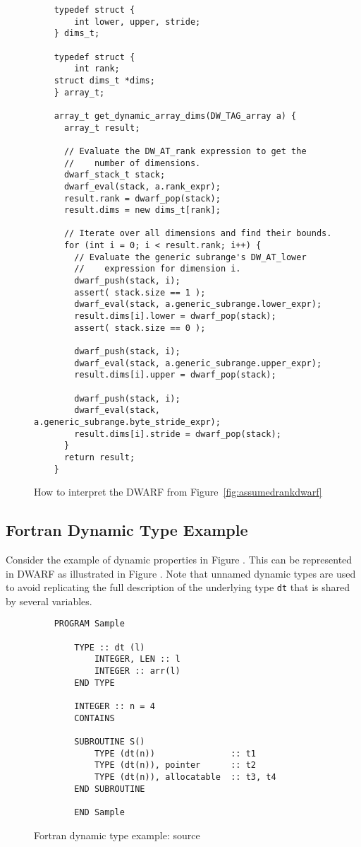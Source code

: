 \begin{figure}[!ht]
\begin{lstlisting}
    typedef struct {
        int lower, upper, stride;
    } dims_t;

    typedef struct {
        int rank;
    struct dims_t *dims;
    } array_t;

    array_t get_dynamic_array_dims(DW_TAG_array a) {
      array_t result;

      // Evaluate the DW_AT_rank expression to get the 
      //    number of dimensions.
      dwarf_stack_t stack;
      dwarf_eval(stack, a.rank_expr);
      result.rank = dwarf_pop(stack); 
      result.dims = new dims_t[rank];

      // Iterate over all dimensions and find their bounds.
      for (int i = 0; i < result.rank; i++) {
        // Evaluate the generic subrange's DW_AT_lower 
        //    expression for dimension i.
        dwarf_push(stack, i);
        assert( stack.size == 1 );
        dwarf_eval(stack, a.generic_subrange.lower_expr);
        result.dims[i].lower = dwarf_pop(stack);
        assert( stack.size == 0 );

        dwarf_push(stack, i);
        dwarf_eval(stack, a.generic_subrange.upper_expr);
        result.dims[i].upper = dwarf_pop(stack);
    
        dwarf_push(stack, i);
        dwarf_eval(stack, a.generic_subrange.byte_stride_expr);
        result.dims[i].stride = dwarf_pop(stack);
      }
      return result;
    }
\end{lstlisting}
\caption{How to interpret the DWARF from Figure~\ref{fig:assumedrankdwarf}}
\label{fig:assumedrankdwarfparser}
\end{figure}


\clearpage
\subsection{Fortran Dynamic Type Example}
\label{app:fortrandynamictypeexample}
Consider the  example of dynamic properties in 
Figure .
This can be represented in DWARF as illustrated in 
Figure .
Note that unnamed dynamic types are used to avoid replicating
the full description of the underlying type \texttt{dt} that is shared by
several variables.

\begin{figure}[ht]
\begin{lstlisting}
	PROGRAM Sample
     
        TYPE :: dt (l)
            INTEGER, LEN :: l
            INTEGER :: arr(l)
        END TYPE

        INTEGER :: n = 4
        CONTAINS

        SUBROUTINE S()
            TYPE (dt(n))               :: t1
            TYPE (dt(n)), pointer      :: t2
            TYPE (dt(n)), allocatable  :: t3, t4
        END SUBROUTINE
     
        END Sample
\end{lstlisting}
\caption{Fortran dynamic type example: source}
\label{fig:fortrandynamictypeexamplesource}
\end{figure}

